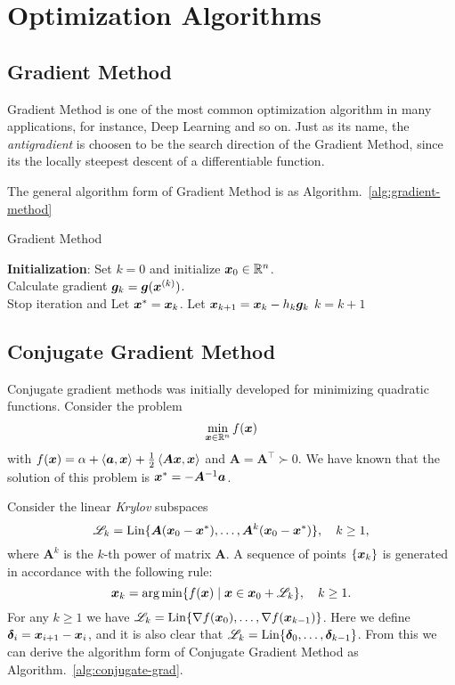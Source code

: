 \section{Optimization Algorithms}

\subsection{Gradient Method}

Gradient Method is one of the most common optimization algorithm in many applications, for instance, Deep Learning and so on.
Just as its name, the \emph{antigradient} is choosen to be the search direction of the Gradient Method, since its the locally 
steepest descent of a differentiable function. 

The general algorithm form of Gradient Method is as Algorithm.~\ref{alg:gradient-method}
\begin{algorithm}[!htbp]
    \caption{Gradient Method}\label{alg:gradient-method}
    \textbf{Initialization}: Set \(k = 0\) and initialize \(\bm{x}_0 \in \mathbb{R}^n\). \\
     {
        Calculate gradient \(\bm{g}_k = \bm{g}(\bm{x}^{(k)})\).\\
         {
            Stop iteration and Let \(\bm{x}^* = \bm{x}_k\).
        }{
            Let \(\bm{x}_{k+1} = \bm{x}_k - h_k \bm{g}_k\)
        }
        \(k = k+1\)
    }
\end{algorithm}

\subsection{Conjugate Gradient Method}

Conjugate gradient methods was initially developed for minimizing quadratic
functions. Consider the problem
\[
    \min_{\bm{x} \in \mathbb{R}^n} f(\bm{x})  
\]
with \(f(\bm{x}) = \alpha + \left\langle \bm{a},\bm{x} \right\rangle + \frac{1}{2} \left\langle \bm{Ax},\bm{x} \right\rangle\)
and \(\bm{A} = \bm{A}^\top \succ 0\). We have known that the solution of this problem is
\(\bm{x}^* = -\bm{A}^{-1}\bm{a}\).

Consider the linear \emph{Krylov} subspaces
\[
    \mathscr{L}_k = \mathrm{Lin} \{ 
        \bm{A} (\bm{x}_0 - \bm{x}^*), \dots, \bm{A}^k (\bm{x}_0 - \bm{x}^*)  
    \}, \quad k \ge 1,  
\]
where \(\bm{A}^k\) is the \(k\)-th power of matrix \(\bm{A}\). A sequence of points \(\{\bm{x}_k\}\)
is generated in accordance with the following rule:
\[
    \bm{x}_k = \mathop{\arg \min} \{ 
        f(\bm{x}) \mid \bm{x} \in \bm{x}_0 + \mathscr{L}_k  
    \}, \quad k \ge 1.  
\]
For any \(k \ge 1\) we have \(\mathscr{L}_k = \mathrm{Lin} \{ \nabla f(\bm{x}_0), \dots, \nabla f(\bm{x}_{k-1}) \}\). Here
we define \(\bm{\delta}_i = \bm{x}_{i+1} - \bm{x}_i\), and it is also clear that 
\(\mathscr{L}_k = \mathrm{Lin} \{ \bm{\delta}_0, \dots, \bm{\delta}_{k-1} \}\). From this we can derive the algorithm form 
of Conjugate Gradient Method as Algorithm.~\ref{alg:conjugate-grad}.

